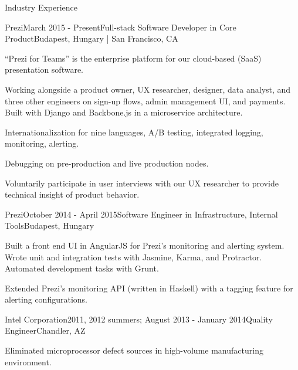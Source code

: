 \documentclass{resume} %
\begin{document}
\begin{rSection}{Industry Experience}

\begin{rSubsection}{Prezi}{March 2015 - Present}{Full-stack Software Developer in Core Product}{Budapest, Hungary | San Francisco, CA}
\item ``Prezi for Teams'' is the enterprise platform for our cloud-based (SaaS) presentation software.
\item Working alongside a product owner, UX researcher, designer, data analyst, and three other engineers on sign-up flows, admin management UI, and payments. Built with Django and Backbone.js in a microservice architecture.
\item Internationalization for nine languages, A/B testing, integrated logging, monitoring, alerting.
\item Debugging on pre-production and live production nodes.
\item Voluntarily participate in user interviews with our UX researcher to provide technical insight of product behavior.
\end{rSubsection}


\begin{rSubsection}{Prezi}{October 2014 - April 2015}{Software Engineer in Infrastructure, Internal Tools}{Budapest, Hungary}
\item Built a front end UI in AngularJS for Prezi's monitoring and alerting system. Wrote unit and integration tests with Jasmine, Karma, and Protractor. Automated development tasks with Grunt.
\item Extended Prezi's monitoring API (written in Haskell) with a tagging feature for alerting configurations.
\end{rSubsection}


\begin{rSubsection}{Intel Corporation}{2011, 2012 summers; August 2013 - January 2014}{Quality Engineer}{Chandler, AZ}
\item Eliminated microprocessor defect sources in high-volume manufacturing environment.
\end{rSubsection}

\end{rSection}
\end{document}

